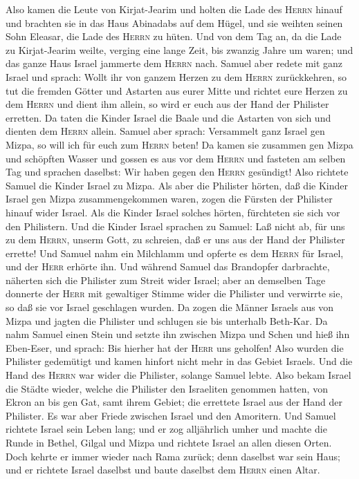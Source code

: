  Also kamen die Leute von Kirjat-Jearim und holten die
Lade des \textsc{Herrn} hinauf und brachten sie in das Haus Abinadabs
auf dem Hügel, und sie weihten seinen Sohn Eleasar, die Lade des
\textsc{Herrn} zu hüten.  Und von dem Tag an, da die Lade
zu Kirjat-Jearim weilte, verging eine lange Zeit, bis zwanzig Jahre um
waren; und das ganze Haus Israel jammerte dem \textsc{Herrn} nach.
 Samuel aber redete mit ganz Israel und sprach: Wollt ihr
von ganzem Herzen zu dem \textsc{Herrn} zurückkehren, so tut die fremden
Götter und Astarten aus eurer Mitte und richtet eure Herzen zu dem
\textsc{Herrn} und dient ihm allein, so wird er euch aus der Hand der
Philister erretten.  Da taten die Kinder Israel die Baale
und die Astarten von sich und dienten dem \textsc{Herrn} allein.
 Samuel aber sprach: Versammelt ganz Israel gen Mizpa, so
will ich für euch zum \textsc{Herrn} beten!  Da kamen sie
zusammen gen Mizpa und schöpften Wasser und gossen es aus vor dem
\textsc{Herrn} und fasteten am selben Tag und sprachen daselbst: Wir
haben gegen den \textsc{Herrn} gesündigt! Also richtete Samuel die
Kinder Israel zu Mizpa.  Als aber die Philister hörten,
daß die Kinder Israel gen Mizpa zusammengekommen waren, zogen die
Fürsten der Philister hinauf wider Israel. Als die Kinder Israel solches
hörten, fürchteten sie sich vor den Philistern.  Und die
Kinder Israel sprachen zu Samuel: Laß nicht ab, für uns zu dem
\textsc{Herrn}, unserm Gott, zu schreien, daß er uns aus der Hand der
Philister errette!  Und Samuel nahm ein Milchlamm und
opferte es dem \textsc{Herrn} für Israel, und der \textsc{Herr} erhörte
ihn.  Und während Samuel das Brandopfer darbrachte,
näherten sich die Philister zum Streit wider Israel; aber an demselben
Tage donnerte der \textsc{Herr} mit gewaltiger Stimme wider die
Philister und verwirrte sie, so daß sie vor Israel geschlagen wurden.
 Da zogen die Männer Israels aus von Mizpa und jagten die
Philister und schlugen sie bis unterhalb Beth-Kar.  Da
nahm Samuel einen Stein und setzte ihn zwischen Mizpa und Schen und hieß
ihn Eben-Eser, und sprach: Bis hierher hat der \textsc{Herr} uns
geholfen!  Also wurden die Philister gedemütigt und kamen
hinfort nicht mehr in das Gebiet Israels. Und die Hand des
\textsc{Herrn} war wider die Philister, solange Samuel lebte.
 Also bekam Israel die Städte wieder, welche die
Philister den Israeliten genommen hatten, von Ekron an bis gen Gat, samt
ihrem Gebiet; die errettete Israel aus der Hand der Philister. Es war
aber Friede zwischen Israel und den Amoritern.  Und
Samuel richtete Israel sein Leben lang;  und er zog
alljährlich umher und machte die Runde in Bethel, Gilgal und Mizpa und
richtete Israel an allen diesen Orten.  Doch kehrte er
immer wieder nach Rama zurück; denn daselbst war sein Haus; und er
richtete Israel daselbst und baute daselbst dem \textsc{Herrn} einen
Altar.

